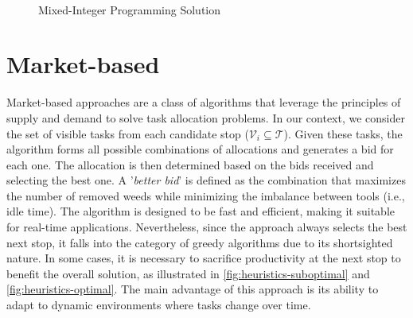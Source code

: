 \begin{figure}[htb]
    \myfloatalign
     \quad
     \\
    \caption{Mixed-Integer Programming Solution}\label{fig:mip-solution}
\end{figure}

\section{Market-based}
Market-based approaches are a class of algorithms that leverage the principles of supply and demand to solve task allocation problems. In our context, we consider the set of visible tasks from each candidate stop ($\mathcal{V}_i \subseteq \mathcal{T}$). Given these tasks, the algorithm forms all possible combinations of allocations and generates a bid for each one. The allocation is then determined based on the bids received and selecting the best one. A '\textit{better bid}' is defined as the combination that maximizes the number of removed weeds while minimizing the imbalance between tools (i.e., idle time). The algorithm is designed to be fast and efficient, making it suitable for real-time applications. Nevertheless, since the approach always selects the best next stop, it falls into the category of greedy algorithms due to its shortsighted nature. In some cases, it is necessary to sacrifice productivity at the next stop to benefit the overall solution, as illustrated in \autoref{fig:heuristics-suboptimal} and \autoref{fig:heuristics-optimal}. The main advantage of this approach is its ability to adapt to dynamic environments where tasks change over time.

